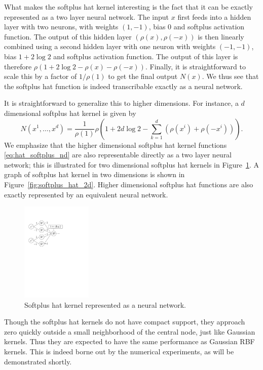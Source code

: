 \documentclass[12pt]{article}
\begin{document}
What makes the softplus hat kernel interesting is the fact that it can be exactly represented as a two layer neural network. The input $x$ first feeds into a hidden layer with two neurons, with weights $(1, -1)$, bias $0$ and softplus activation function. The output of this hidden layer $(\rho(x), \rho(-x))$ is then linearly combined using a second hidden layer with one neuron with weights $(-1, -1)$, bias $1 + 2\log 2$ and softplus activation function. The output of this layer is therefore $\rho\left(1 + 2\log 2 - \rho(x) - \rho(-x)\right)$. Finally, it is straightforward to scale this by a factor of $1/\rho(1)$ to get the final output $N(x)$. We thus see that the softplus hat function is indeed transcribable exactly as a neural network.

It is straightforward to generalize this to higher dimensions. For instance, a $d$ dimensional softplus hat kernel is given by
\begin{equation} \label{eq:hat_softplus_nd}
N(x^1, \ldots, x^d) = \frac{1}{\rho(1)}\rho\left(1 + 2d\log 2 - \sum_{k=1}^d (\rho(x^i) + \rho(-x^i))\right).
\end{equation}
We emphasize that the higher dimensional softplus hat kernel functions \eqref{eq:hat_softplus_nd} are also representable directly as a two layer neural network; this is illustrated for two dimensional softplus hat kernels in Figure~\ref{fig:softplus_hat_nn}. A graph of softplus hat kernel in two dimensions is shown in Figure~\ref{fig:softplus_hat_2d}. Higher dimensional softplus hat functions are also exactly represented by an equivalent neural network.

\begin{figure}
\centering
\includegraphics[width=0.3\textwidth]{images/softplus_hat_nn.pdf}
\caption{Softplus hat kernel represented as a neural network.}
\label{fig:softplus_hat_nn}
\end{figure}

Though the softplus hat kernels do not have compact support, they approach zero quickly outside a small neighborhood of the central node, just like Gaussian kernels. Thus they are expected to have the same performance as Gaussian RBF kernels. This is indeed borne out by the numerical experiments, as will be demonstrated shortly.
\end{document}
